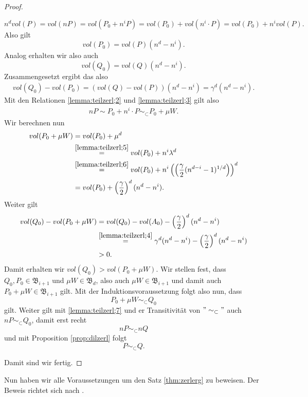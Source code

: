\documentclass[11pt,titlepage]{article}
\theoremstyle{definition}
\theoremstyle{remark}
\begin{document}
\begin{proof}
\begin{itemize}
			\[n^d vol(P)=vol(nP)=vol(P_0+n^i P)=vol(P_0)+vol(n^i\cdot P)
			=vol(P_0)+n^i vol(P).\]
			Also gilt
			\[vol(P_0)=vol(P)(n^d -n^i).\]
			Analog erhalten wir also auch
			\[vol(Q_0)=vol(Q)(n^d -n^i).\]
			Zusammengesetzt ergibt das also 
			\begin{align}
				vol(Q_0)-vol(P_0)=(vol(Q)-vol(P))(n^d -n^i)=\gamma^d(n^d-n^i). \label{lemma:teilzerl;4}
			\end{align}
			Mit den Relationen \ref{lemma:teilzerl;2} und 
			\ref{lemma:teilzerl;3} gilt also 
			\begin{align}
				nP\sim P_0+n^i\cdot P \sim_{\subset} P_0 + \mu W. \label{lemma:teilzerl;7}
			\end{align}
			Wir berechnen nun
			\begin{align*}
				vol(P_0+\mu W) &= vol(P_0)+\mu^d \\
				&\overset{\ref{lemma:teilzerl;5}}{=} vol(P_0)+n^i\lambda^d \\
				&\overset{\ref{lemma:teilzerl;6}}{=}
				 vol(P_0)+n^i\left(\left(\frac{\gamma}{2}
				(n^{d-i}-1)^{1/d}\right)\right)^d \\
				&=vol(P_0)+\left(\frac{\gamma}{2}\right)^d (n^d-n^i).
			\end{align*}
			Weiter gilt 
			\begin{align*}
				vol(Q_0)-vol(P_0+\mu W)&= vol(Q_0)-vol(A_0)-
				\left(\frac{\gamma}{2}\right)^d (n^d-n^i) \\
				&\overset{\ref{lemma:teilzerl;4}}{=} \gamma^d(n^d-n^i)-
				\left(\frac{\gamma}{2}\right)^d (n^d-n^i) \\
				&>0.
			\end{align*}
			Damit erhalten wir $vol(Q_0)>vol(P_0+\mu W)$. Wir stellen fest, 
			dass $Q_0,P_0\in\mathfrak{B}_{i+1}$ und $\mu W\in \mathfrak{B}_d$, 
			also auch $\mu W\in\mathfrak{B}_{i+1}$ und damit auch 
			$P_0+\mu W\in\mathfrak{B}_{i+1}$ gilt. Mit der Induktionsvoraussetzung 
			folgt also nun, dass 
			\[P_0+\mu W\sim_{\subset} Q_0\]
			gilt. Weiter gilt mit \ref{lemma:teilzerl;7} und er Transitivität von $"\sim_{\subset}"$ auch $nP\sim_{\subset}Q_0$, 
			damit erst recht 
			\[nP\sim_{\subset}nQ\]
			und mit Proposition \ref{prop:dilzerl} folgt
			\[P\sim_{\subset}Q.\]
		\end{itemize}
	Damit sind wir fertig.
	\end{proof}
	
	Nun haben wir alle Voraussetzungen um den Satz \ref{thm:zerlerg} zu 
	beweisen. Der Beweis richtet sich nach \cite[Satz III]{Hadwiger}.
	
\end{document}
